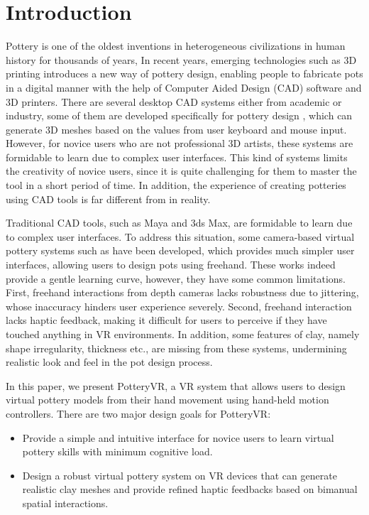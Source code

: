 \section{Introduction}
\label{sec:1}
Pottery is one of the oldest inventions in heterogeneous civilizations in human history for thousands of years, 
In recent years, emerging technologies such as 3D printing introduces a new way of pottery design, enabling people to fabricate pots in a digital manner with the help of Computer Aided Design (CAD) software and 3D printers.
There are several desktop CAD systems either from academic or industry, some of them are developed specifically for pottery design \cite{koutsoudis2009qp,kumar2011wheel}, which can generate 3D meshes based on the values from user keyboard and mouse input.
However, for novice users who are not professional 3D artists, these systems are formidable to learn due to complex user interfaces. 
This kind of systems limits the creativity of novice users, since it is quite challenging for them to master the tool in a short period of time.
In addition, the experience of creating potteries using CAD tools is far different from in reality.

Traditional CAD tools, such as Maya\cite{website:maya} and 3ds Max\cite{website:3dmax}, are formidable to learn due to complex user interfaces.
To address this situation, some camera-based virtual pottery systems such as \cite{ramani2015gesture,murugappan2013handy,han2014virtual} have been developed, which provides much simpler user interfaces, allowing users to design pots using freehand.
These works indeed provide a gentle learning curve, however, they have some common limitations.
First, freehand interactions from depth cameras lacks robustness due to jittering, whose inaccuracy hinders user experience severely.
Second, freehand interaction lacks haptic feedback, making it difficult for users to perceive if they have touched anything in VR environments.
In addition, some features of clay, namely shape irregularity, thickness etc., are missing from these systems, undermining realistic look and feel in the pot design process.

In this paper, we present PotteryVR, a VR system that allows users to design virtual pottery models from their hand movement using hand-held motion controllers. There are two major design goals for PotteryVR:

\begin{itemize}
\item Provide a simple and intuitive interface for novice users to learn virtual pottery skills with minimum cognitive load.
\item Design a robust virtual pottery system on VR devices that can generate realistic clay meshes and provide refined haptic feedbacks based on bimanual spatial interactions.
\end{itemize}

